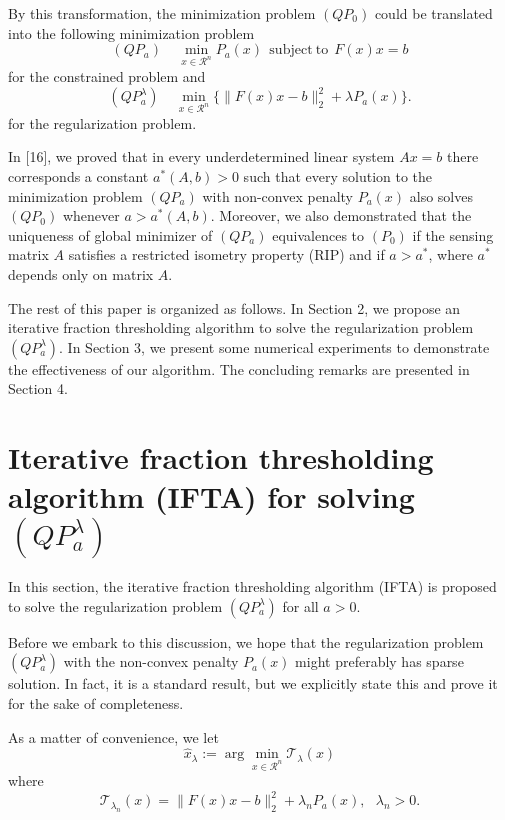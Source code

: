 \documentclass[smallextended]{svjour3}
\begin{document}
By this transformation, the minimization problem $(QP_{0})$ could be translated into the following minimization problem
\begin{equation}\label{r14}
(QP_{a})\ \ \ \ \ \min_{x\in \mathcal{R}^{n}} P_{a}(x)\ \ \mathrm{subject}\ \mathrm{to}\ \ F(x)x=b
\end{equation}
for the constrained problem and
\begin{equation}\label{r15}
(QP_{a}^{\lambda})\ \ \ \ \ \min_{x\in \mathcal{R}^{n}}\Big\{\|F(x)x-b\|_{2}^{2}+\lambda P_{a}(x)\Big\}.
\end{equation}
for the regularization problem.

In [16], we proved that in every underdetermined linear system $Ax=b$ there corresponds a constant $a^{\ast}(A,b)>0$ such
that every solution to the minimization problem $(QP_{a})$ with non-convex penalty $P_{a}(x)$ also solves $(QP_{0})$ whenever $a>a^{\ast}(A,b)$.
Moreover, we also demonstrated that the uniqueness of global minimizer of $(QP_{a})$ equivalences to $(P_{0})$ if the
sensing matrix $A$ satisfies a restricted isometry property (RIP) and if $a>a^{\ast}$, where $a^{\ast}$ depends only on matrix $A$.

The rest of this paper is organized as follows. In Section 2, we propose an iterative fraction thresholding algorithm to
solve the regularization problem $(QP_{a}^{\lambda})$. In Section 3, we present some numerical experiments to demonstrate
the effectiveness of our algorithm. The concluding remarks are presented in Section 4.

\section{Iterative fraction thresholding algorithm (IFTA) for solving $(QP_{a}^{\lambda})$}
In this section, the iterative fraction thresholding algorithm (IFTA) is proposed to solve the regularization problem $(QP_{a}^{\lambda})$
for all $a>0$.

Before we embark to this discussion, we hope that the regularization problem $(QP_{a}^{\lambda})$ with the non-convex penalty
$P_{a}(x)$ might preferably has sparse solution. In fact, it is a standard result, but we explicitly state this and prove it for
the sake of completeness.

As a matter of convenience, we let
\begin{equation}\label{r16}
\hat{x}_{\lambda}:=\arg\min_{x\in \mathcal{R}^{n}}\mathcal{T}_{\lambda}(x)
\end{equation}
where
$$\mathcal{T}_{\lambda_{n}}(x)=\|F(x)x-b\|_{2}^{2}+\lambda_{n} P_{a}(x),\ \ \ \lambda_{n}>0.$$
\end{document}
